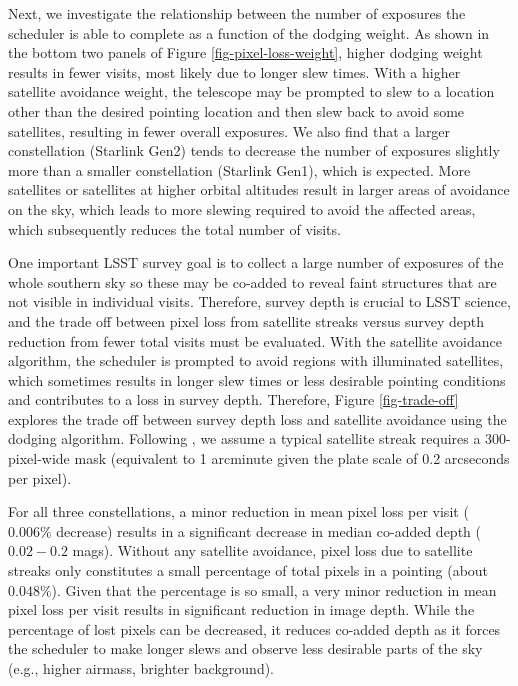 \documentclass[twocolumn]{aastex631}
\begin{document}
Next, we investigate the relationship between the number of exposures the scheduler is able to complete as a function of the dodging weight. As shown in the bottom two panels of Figure \ref{fig-pixel-loss-weight}, higher dodging weight results in fewer visits, most likely due to longer slew times. With a higher satellite avoidance weight, the telescope may be prompted to slew to a location other than the desired pointing location and then slew back to avoid some satellites, resulting in fewer overall exposures. We also find that a larger constellation (Starlink Gen2) tends to decrease the number of exposures slightly more than a smaller constellation (Starlink Gen1), which is expected. More satellites or satellites at higher orbital altitudes result in larger areas of avoidance on the sky, which leads to more slewing required to avoid the affected areas, which subsequently reduces the total number of visits.

One important LSST survey goal is to collect a large number of exposures of the whole southern sky so these may be co-added to reveal faint structures that are not visible in individual visits. Therefore, survey depth is crucial to LSST science, and the trade off between pixel loss from satellite streaks versus survey depth reduction from fewer total visits must be evaluated. With the satellite avoidance algorithm, the scheduler is prompted to avoid regions with illuminated satellites, which sometimes results in longer slew times or less desirable pointing conditions and contributes to a loss in survey depth. Therefore, Figure \ref{fig-trade-off} explores the trade off between survey depth loss and satellite avoidance using the dodging algorithm. Following \citet{hasan22}, we assume a typical satellite streak requires a 300-pixel-wide mask (equivalent to 1 arcminute given the plate scale of 0.2 arcseconds per pixel).

For all three constellations, a minor reduction in mean pixel loss per visit ($0.006\%$ decrease) results in a significant decrease in median co-added depth ($0.02-0.2$ mags). Without any satellite avoidance, pixel loss due to satellite streaks only constitutes a small percentage of total pixels in a pointing (about $0.048\%$). Given that the percentage is so small, a very minor reduction in mean pixel loss per visit results in significant reduction in image depth. While the percentage of lost pixels can be decreased, it reduces co-added depth as it forces the scheduler to make longer slews and observe less desirable parts of the sky (e.g., higher airmass, brighter background).
\end{document}
